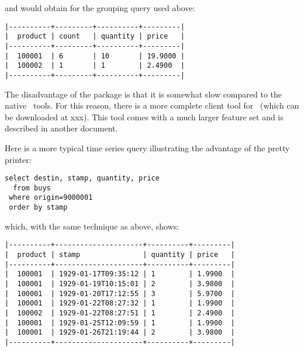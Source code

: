 
and would obtain for the grouping query used above:

\begin{minipage}{\textwidth}
\begin{verbatim}
|----------+---------+----------+---------|
|  product | count   | quantity | price   |
|----------+---------+----------+---------|
|  100001  | 6       | 10       | 19.9000 |
|  100002  | 1       | 1        | 2.4900  |
|----------+---------+----------+---------|
\end{verbatim}
\end{minipage}

The disadvantage of the  package is that
it is somewhat slow compared to the native \nowdb\ tools.
For this reason, there is a more complete client tool
for \nowdb\ (which can be downloaded at xxx).
This tool comes with a much larger feature set
and is described in another document.

Here is a more typical time series query illustrating
the advantage of the pretty printer:

\begin{sqlcode}
\begin{lstlisting}
select destin, stamp, quantity, price
  from buys
 where origin=9000001 
 order by stamp
\end{lstlisting}
\end{sqlcode}

\begin{minipage}{\textwidth}
which, with the same technique as above, shows:
\begin{verbatim}
|----------+---------------------+----------+---------|
|  product | stamp               | quantity | price   |
|----------+---------------------+----------+---------|
|  100001  | 1929-01-17T09:35:12 | 1        | 1.9900  |
|  100001  | 1929-01-19T10:15:01 | 2        | 3.9800  |
|  100001  | 1929-01-20T17:12:55 | 3        | 5.9700  |
|  100001  | 1929-01-22T08:27:32 | 1        | 1.9900  |
|  100002  | 1929-01-22T08:27:51 | 1        | 2.4900  |
|  100001  | 1929-01-25T12:09:59 | 1        | 1.9900  |
|  100001  | 1929-01-26T21:19:44 | 2        | 3.9800  |
|----------+---------------------+----------+---------|
\end{verbatim}
\end{minipage}

